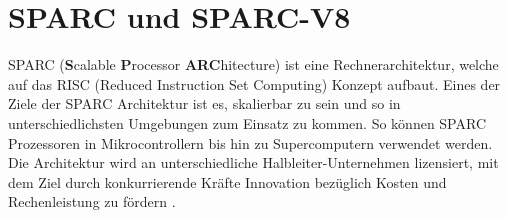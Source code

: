 








\section{SPARC und SPARC-V8}

SPARC (\textbf{S}calable \textbf{P}rocessor \textbf{ARC}hitecture) ist eine Rechnerarchitektur, welche auf das
RISC (Reduced Instruction Set Computing) Konzept aufbaut. Eines der Ziele der SPARC Architektur ist es, skalierbar
zu sein und so in unterschiedlichsten Umgebungen zum Einsatz zu kommen. So können SPARC Prozessoren in
Mikrocontrollern bis hin zu Supercomputern verwendet werden. Die Architektur wird an unterschiedliche
Halbleiter-Unternehmen lizensiert, mit dem Ziel durch konkurrierende Kräfte Innovation bezüglich Kosten und
Rechenleistung zu fördern \cite{sparc}.

